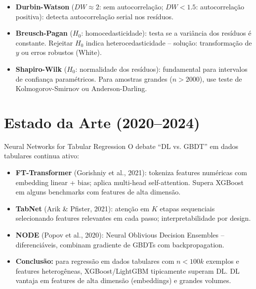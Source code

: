 \documentclass[12pt,a4paper]{article}
\begin{document}
\begin{itemize}
  \item \textbf{Durbin-Watson} ($DW \approx 2$: sem autocorrelação; $DW < 1.5$: autocorrelação positiva): detecta autocorrelação serial nos resíduos.
  \item \textbf{Breusch-Pagan} ($H_0$: homocedasticidade): testa se a variância dos resíduos é constante. Rejeitar $H_0$ indica heterocedasticidade -- solução: transformação de $y$ ou erros robustos (White).
  \item \textbf{Shapiro-Wilk} ($H_0$: normalidade dos resíduos): fundamental para intervalos de confiança paramétricos. Para amostras grandes ($n > 2000$), use teste de Kolmogorov-Smirnov ou Anderson-Darling.
\end{itemize}

\section{Estado da Arte (2020--2024)}

\begin{estadoartebox}{Neural Networks for Tabular Regression}
O debate ``DL vs. GBDT'' em dados tabulares continua ativo:
\begin{itemize}
  \item \textbf{FT-Transformer} (Gorishniy et al., 2021): tokeniza features numéricas com embedding linear + bias; aplica multi-head self-attention. Supera XGBoost em alguns benchmarks com features de alta dimensão.
  \item \textbf{TabNet} (Arik \& Pfister, 2021): atenção em $K$ etapas sequenciais selecionando features relevantes em cada passo; interpretabilidade por design.
  \item \textbf{NODE} (Popov et al., 2020): Neural Oblivious Decision Ensembles -- diferenciáveis, combinam gradiente de GBDTs com backpropagation.
  \item \textbf{Conclusão:} para regressão em dados tabulares com $n < 100k$ exemplos e features heterogêneas, XGBoost/LightGBM tipicamente superam DL. DL vantaja em features de alta dimensão (embeddings) e grandes volumes.
\end{itemize}
\end{estadoartebox}
\end{document}
